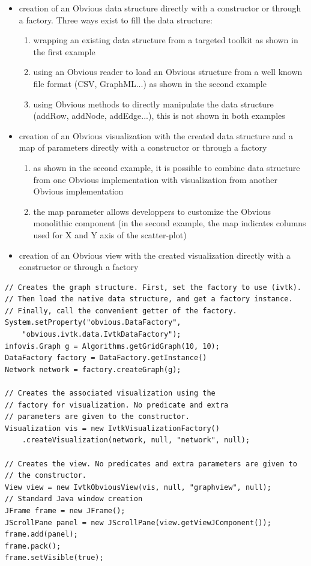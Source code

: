 \begin{itemize}
 \item creation of an Obvious data structure directly with a constructor or through a factory. Three ways exist to fill the data structure:
 \begin{enumerate}
  \item wrapping an existing data structure from a targeted toolkit as shown in the first example
  \item using an Obvious reader to load an Obvious structure from a well known file format (CSV, GraphML...) as shown in the second example
  \item using Obvious methods to directly manipulate the data structure (addRow, addNode, addEdge...), this is not shown in both examples 
 \end{enumerate}
 \item creation of an Obvious visualization with the created data structure and a map of parameters directly with a constructor or through a factory
 \begin{enumerate}
  \item as shown in the second example, it is possible to combine data structure from one Obvious implementation with visualization from another Obvious implementation
  \item the map parameter allows developpers to customize the Obvious monolithic component (in the second example, the map indicates columns used for X and Y axis of the scatter-plot)
 \end{enumerate}
 \item creation of an Obvious view with the created visualization directly with a constructor or through a factory
\end{itemize} 

\begin{lstlisting}[caption={Visualizing a graph with Obvious},label=codeSample1]
// Creates the graph structure. First, set the factory to use (ivtk).
// Then load the native data structure, and get a factory instance.
// Finally, call the convenient getter of the factory.
System.setProperty("obvious.DataFactory",
    "obvious.ivtk.data.IvtkDataFactory");
infovis.Graph g = Algorithms.getGridGraph(10, 10);
DataFactory factory = DataFactory.getInstance()
Network network = factory.createGraph(g);

// Creates the associated visualization using the
// factory for visualization. No predicate and extra
// parameters are given to the constructor.
Visualization vis = new IvtkVisualizationFactory()
    .createVisualization(network, null, "network", null);

// Creates the view. No predicates and extra parameters are given to
// the constructor.
View view = new IvtkObviousView(vis, null, "graphview", null);
// Standard Java window creation
JFrame frame = new JFrame();
JScrollPane panel = new JScrollPane(view.getViewJComponent());
frame.add(panel);
frame.pack();
frame.setVisible(true);
\end{lstlisting}

